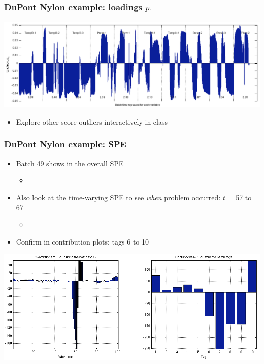 \begin{frame}\frametitle{DuPont Nylon example: loadings \( p_1 \)}

\begin{center}
	\includegraphics[width=\textwidth]{images/dupont/dupont-loadings-p1.png}
\end{center}

	\begin{itemize}
		\item	Explore other score outliers interactively in class
	\end{itemize}
\end{frame}

\begin{frame}\frametitle{DuPont Nylon example: SPE}

	\begin{itemize}
		\item	Batch 49 shows in the overall SPE 
		
		 		\begin{itemize}
		 			\item	{} 
		 		\end{itemize}

		\item 	Also look at the time-varying SPE to see \emph{when} problem occurred: \( t \) = 57 to 67 
		
				\begin{itemize}
					\item	{} 
				\end{itemize}
		
		\item 	Confirm in contribution plots: tags 6 to 10
	\end{itemize}
	
	\begin{center}
		\includegraphics[width=\textwidth]{images/dupont/dupont-batch-49-spe.png}
	\end{center}
\end{frame}

